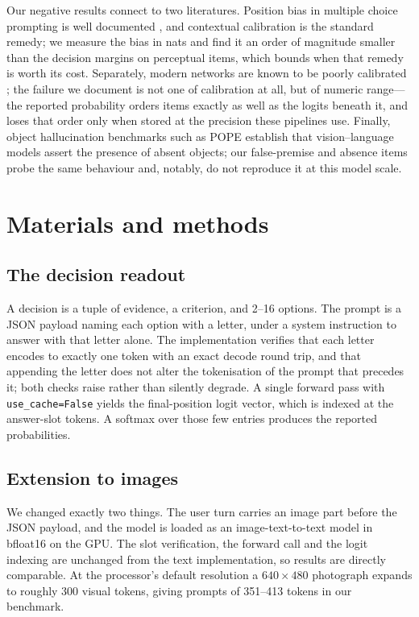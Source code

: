 \documentclass[10pt,twocolumn]{article}
\begin{document}
Our negative results connect to two literatures. Position bias in multiple
choice prompting is well documented \cite{zheng2024mcq}, and contextual
calibration \cite{zhao2021calibrate} is the standard remedy; we measure the
bias in nats and find it an order of magnitude smaller than the decision
margins on perceptual items, which bounds when that remedy is worth its cost.
Separately, modern networks are known to be poorly calibrated
\cite{guo2017calibration}; the failure we document is not one of calibration at
all, but of numeric range---the reported probability orders items exactly as
well as the logits beneath it, and loses that order only when stored at the
precision these pipelines use.
Finally, object hallucination benchmarks such as POPE \cite{li2023pope}
establish that vision--language models assert the presence of absent objects;
our false-premise and absence items probe the same behaviour and, notably, do
not reproduce it at this model scale.

\section{Materials and methods}
\label{sec:method}

\subsection{The decision readout}

A decision is a tuple of evidence, a criterion, and 2--16 options. The prompt
is a JSON payload naming each option with a letter, under a system instruction
to answer with that letter alone. The implementation verifies that each letter
encodes to exactly one token with an exact decode round trip, and that
appending the letter does not alter the tokenisation of the prompt that
precedes it; both checks raise rather than silently degrade. A single forward
pass with \texttt{use\_cache=False} yields the final-position logit vector,
which is indexed at the answer-slot tokens. A softmax over those few entries
produces the reported probabilities.

\subsection{Extension to images}

We changed exactly two things. The user turn carries an image part before the
JSON payload, and the model is loaded as an image-text-to-text model in
bfloat16 on the GPU. The slot verification, the forward call and the logit
indexing are unchanged from the text implementation, so results are directly
comparable. At the processor's default resolution a $640\times480$ photograph
expands to roughly 300 visual tokens, giving prompts of 351--413 tokens in our
benchmark.
\end{document}
